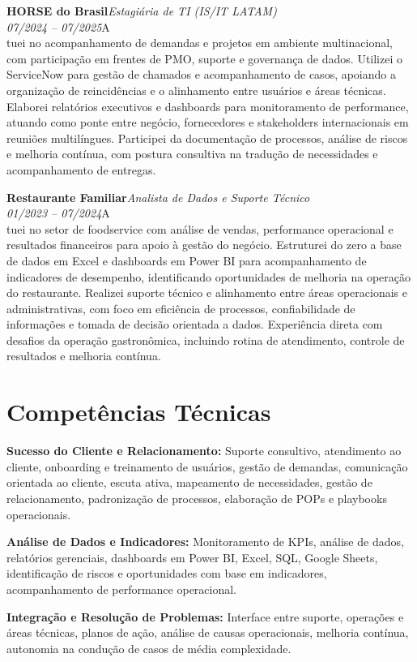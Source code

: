 \documentclass[11pt,a4paper]{article}
\newcommand{\cvrole}[4]{%
  \vspace{4pt}%
  {\bfseries\color{accentcolor}#1}\hfill{\itshape #2}\\[-2pt]%
  {\itshape #3}\hfill #4\\[6pt]%
}
\begin{document}
\cvrole{HORSE do Brasil}{Estagiária de TI (IS/IT LATAM)}{07/2024 -- 07/2025}

Atuei no acompanhamento de demandas e projetos em ambiente multinacional, com participação em frentes de PMO, suporte e governança de dados. Utilizei o ServiceNow para gestão de chamados e acompanhamento de casos, apoiando a organização de reincidências e o alinhamento entre usuários e áreas técnicas. Elaborei relatórios executivos e dashboards para monitoramento de performance, atuando como ponte entre negócio, fornecedores e stakeholders internacionais em reuniões multilíngues. Participei da documentação de processos, análise de riscos e melhoria contínua, com postura consultiva na tradução de necessidades e acompanhamento de entregas.

\cvrole{Restaurante Familiar}{Analista de Dados e Suporte Técnico}{01/2023 -- 07/2024}

Atuei no setor de foodservice com análise de vendas, performance operacional e resultados financeiros para apoio à gestão do negócio. Estruturei do zero a base de dados em Excel e dashboards em Power BI para acompanhamento de indicadores de desempenho, identificando oportunidades de melhoria na operação do restaurante. Realizei suporte técnico e alinhamento entre áreas operacionais e administrativas, com foco em eficiência de processos, confiabilidade de informações e tomada de decisão orientada a dados. Experiência direta com desafios da operação gastronômica, incluindo rotina de atendimento, controle de resultados e melhoria contínua.

\section{Competências Técnicas}

\textbf{Sucesso do Cliente e Relacionamento:} Suporte consultivo, atendimento ao cliente, onboarding e treinamento de usuários, gestão de demandas, comunicação orientada ao cliente, escuta ativa, mapeamento de necessidades, gestão de relacionamento, padronização de processos, elaboração de POPs e playbooks operacionais.

\textbf{Análise de Dados e Indicadores:} Monitoramento de KPIs, análise de dados, relatórios gerenciais, dashboards em Power BI, Excel, SQL, Google Sheets, identificação de riscos e oportunidades com base em indicadores, acompanhamento de performance operacional.

\textbf{Integração e Resolução de Problemas:} Interface entre suporte, operações e áreas técnicas, planos de ação, análise de causas operacionais, melhoria contínua, autonomia na condução de casos de média complexidade.
\end{document}
